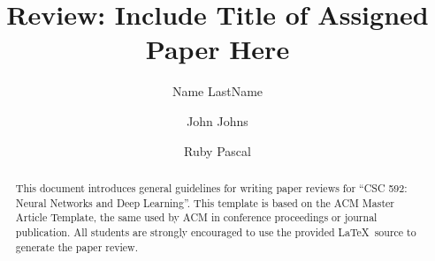 \documentclass[acmsmall,nonacm]{acmart}
\begin{document}
\title[Short Title Here]{Review: Include Title of Assigned Paper Here}

\author{Name LastName}

\author{John Johns}

\author{Ruby Pascal}

\begin{abstract}
    This document introduces general guidelines for writing paper reviews for ``CSC 592: Neural Networks and Deep Learning''. This template is based on the ACM Master Article Template, the same used by ACM in conference proceedings or journal publication. All students are strongly encouraged to use the provided \LaTeX\ source to generate the paper review.
\end{abstract}

\maketitle
\end{document}
